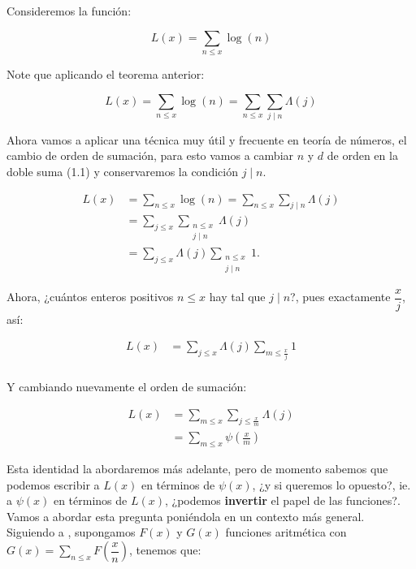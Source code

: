 Consideremos la función: 

$$L(x)=\sum_{n\leq x}\log(n)$$

Note que aplicando el teorema anterior:

\begin{equation}
L(x)=\sum_{n\leq x}\log(n)=\sum_{n\leq x}\sum_{j\mid n}\Lambda(j)
\end{equation}

Ahora vamos a aplicar una técnica muy útil y frecuente en teoría de números, el cambio de orden de sumación, para esto vamos a cambiar $n$ y $d$ de orden en la doble suma (1.1) y conservaremos la condición $j\mid n$.

\begin{align*}
    L(x)&=\sum_{n\leq x}\log(n)=\sum_{n\leq x}\sum_{j\mid n}\Lambda(j)\\
    &=\sum_{j \leq x} \sum_{\substack{n \leq x \\
j \mid n}} \Lambda(j)\\
&=\sum_{j \leq x} \Lambda(j) \sum_{\substack{n \leq x \\
j \mid n}} 1
.\end{align*}

Ahora, ¿cuántos enteros positivos $n\leq x$ hay tal que $j\mid n$?, pues exactamente $\dfrac{x}{j}$, así:

\begin{align*}
    L(x)&=\sum_{j\leq x}\Lambda(j)\sum_{m\leq \frac{x}{j}}1\\
\end{align*}

Y cambiando nuevamente el orden de sumación:

\begin{align*}
    L(x)&=\sum_{m\leq x}\sum_{j\leq \frac{x}{m}}\Lambda(j)\\
    &=\sum_{m\leq x}\psi\left(\frac{x}{m}\right)
\end{align*}

Esta identidad la abordaremos más adelante, pero de momento sabemos que podemos escribir a $L(x)$ en términos de $\psi(x)$, ¿y si queremos lo opuesto?, ie. a $\psi(x)$ en términos de  $L(x)$, ¿podemos \textbf{invertir} el papel de las funciones?. Vamos a abordar esta pregunta poniéndola en un contexto más general.\\

Siguiendo a \cite{levinson1969motivated}, supongamos $F(x)$ y $G(x)$ funciones aritmética con $G(x)=\displaystyle\sum_{n\leq x}F\left(\dfrac{x}{n}\right)$, tenemos que:

